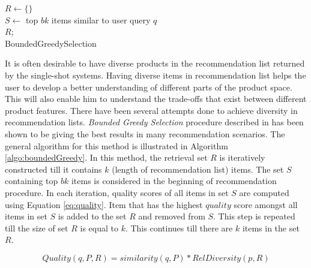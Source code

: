 \begin{algorithm}[ht]
  \DontPrintSemicolon

  $R \gets \{\}$\\
  $S \gets$ top $bk$ items similar to user query $q$\\
  \Return $R$;\\
  \caption{BoundedGreedySelection}
  \label{algo:boundedGreedy}
\end{algorithm}
It is often desirable to have diverse products in the recommendation list returned by the single-shot systems.
Having diverse items in recommendation list helps the user to develop a better understanding of different parts of the product space.
This will also enable him to understand the trade-offs that exist between different product features.
There have been several attempts done to achieve diversity in recommendation lists.
\textit{Bounded Greedy Selection} procedure described in \cite{boundedGreedy} has been shown to be giving the best results in many recommendation scenarios. 
The general algorithm for this method is illustrated in Algorithm \ref{algo:boundedGreedy}.
In this method, the retrieval set $R$ is iteratively constructed till it contains $k$ (length of recommendation list) items.
The set $S$ containing top $bk$ items is considered in the beginning of recommendation procedure. 
In each iteration, quality scores of all items in set $S$ are computed using Equation \ref{eq:quality}.
Item that has the highest $quality$ score amongst all items in set $S$ is added to the set $R$ and removed from $S$. 
This step is repeated till the size of set $R$ is equal to $k$.
This continues till there are $k$ items in the set $R$.

\begin{equation}
\label{eq:quality}
Quality(q, P, R) = similarity(q, P) * RelDiversity(p, R)
\end{equation}


